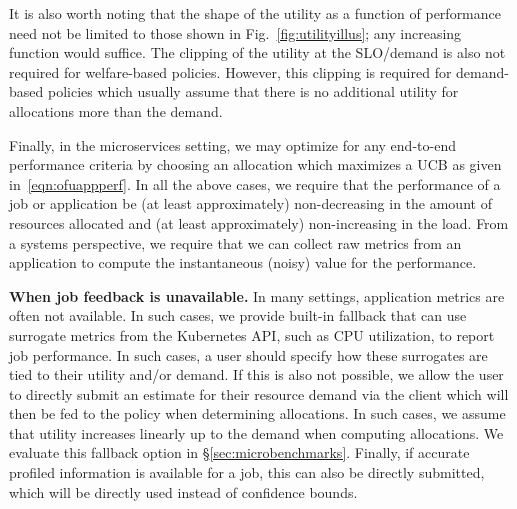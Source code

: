 It is also worth noting that the shape of the utility as a function of performance need not
be limited to those shown in Fig.~\ref{fig:utilityillus}; any increasing function would
suffice.
The clipping of the utility at the SLO/demand is also not required for welfare-based policies.
However, this clipping is required for demand-based policies which usually assume that there is
no additional utility for allocations more than the demand. 

Finally, in the microservices setting, we may optimize for any end-to-end performance criteria
by choosing an allocation which maximizes a UCB as given
in~\eqref{eqn:ofuappperf}.
% 
In all the above cases, we require that the performance of a job or application be
(at least approximately) non-decreasing in the amount of resources allocated and 
(at least approximately) non-increasing in the load.
From a systems perspective, we require that we can collect
raw metrics from an application to compute the instantaneous (noisy) value for the performance. 


\textbf{When job feedback is unavailable.}
In many settings, application metrics are often not available. In such cases,
we provide built-in fallback
that can use surrogate metrics from the Kubernetes API, such as CPU utilization, to report job
performance.
In such cases, a user should specify how these surrogates are tied to their utility
and/or demand.
If this is also not possible, we allow the user to directly submit an estimate for their resource
demand via the client which will then be fed to the policy when determining allocations.
In such cases, we assume that utility increases linearly up to the demand when computing
allocations.
We evaluate this fallback option in \S\ref{sec:microbenchmarks}.
Finally, if accurate profiled information is available for a job,
this can also be directly submitted, which will be directly used instead of confidence bounds.


